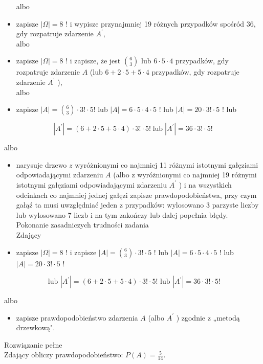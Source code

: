 \documentclass[10pt]{article}
\begin{document}
\begin{itemize}
albo
  \item zapisze $|\Omega|=8$ ! i wypisze przynajmniej 19 różnych przypadków spośród 36, gdy rozpatruje zdarzenie $A^{\prime}$,\\
albo
  \item zapisze $|\Omega|=8$ ! i zapisze, że jest $\binom{6}{3}$ lub $6 \cdot 5 \cdot 4$ przypadków, gdy rozpatruje zdarzenie $A$ (lub $6+2 \cdot 5+5 \cdot 4$ przypadków, gdy rozpatruje zdarzenie $A^{\prime}$ ),\\
albo
  \item zapisze $|A|=\binom{6}{3} \cdot 3!\cdot 5!$ lub $|A|=6 \cdot 5 \cdot 4 \cdot 5$ ! lub $|A|=20 \cdot 3!\cdot 5$ ! lub
\end{itemize}

$$
\left|A^{\prime}\right|=(6+2 \cdot 5+5 \cdot 4) \cdot 3!\cdot 5!\operatorname{lub}\left|A^{\prime}\right|=36 \cdot 3!\cdot 5!
$$

albo

\begin{itemize}
  \item narysuje drzewo $z$ wyróżnionymi co najmniej 11 różnymi istotnymi gałęziami odpowiadającymi zdarzeniu $A$ (albo z wyróżnionymi co najmniej 19 różnymi istotnymi gałęziami odpowiadającymi zdarzeniu $A^{\prime}$ ) i na wszystkich odcinkach co najmniej jednej gałęzi zapisze prawdopodobieństwa, przy czym gałąź ta musi uwzględniać jeden z przypadków: wylosowano 3 parzyste liczby lub wylosowano 7 liczb i na tym zakończy lub dalej popełnia błędy.\\
Pokonanie zasadniczych trudności zadania\\
Zdający
  \item zapisze $|\Omega|=8$ ! i zapisze $|A|=\binom{6}{3} \cdot 3!\cdot 5$ ! lub $|A|=6 \cdot 5 \cdot 4 \cdot 5$ ! lub $|A|=20 \cdot 3!\cdot 5$ !
\end{itemize}

$$
\text { lub }\left|A^{\prime}\right|=(6+2 \cdot 5+5 \cdot 4) \cdot 3!\cdot 5!\text { lub }\left|A^{\prime}\right|=36 \cdot 3!\cdot 5!
$$

albo

\begin{itemize}
  \item zapisze prawdopodobieństwo zdarzenia $A$ (albo $A^{\prime}$ ) zgodnie z „metodą drzewkową".
\end{itemize}

Rozwiązanie pełne\\
Zdający obliczy prawdopodobieństwo: $P(A)=\frac{5}{14}$.
\end{document}
